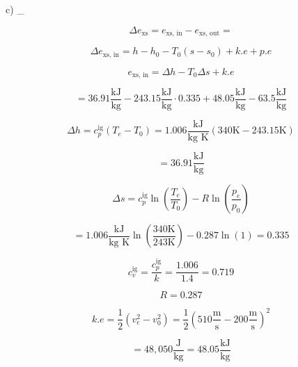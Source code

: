 c) \quad {}_{}

\[
\Delta e_{\text{xs}} = e_{\text{xs, in}} - e_{\text{xs, out}} = 
\]

\[
\Delta e_{\text{xs, in}} = h - h_0 - T_0 (s - s_0) + k.e + p.e
\]

\[
e_{\text{xs, in}} = \Delta h - T_0 \Delta s + k.e
\]

\[
= 36.91 \frac{\text{kJ}}{\text{kg}} - 243.15 \frac{\text{kJ}}{\text{kg}} \cdot 0.335 + 48.05 \frac{\text{kJ}}{\text{kg}} - 63.5 \frac{\text{kJ}}{\text{kg}}
\]

\[
\Delta h = c_p^{\text{ig}} (T_e - T_0) = 1.006 \frac{\text{kJ}}{\text{kg K}} (340 \text{K} - 243.15 \text{K})
\]

\[
= 36.91 \frac{\text{kJ}}{\text{kg}}
\]

\[
\Delta s = c_p^{\text{ig}} \ln \left( \frac{T_e}{T_0} \right) - R \ln \left( \frac{p_e}{p_0} \right)
\]

\[
= 1.006 \frac{\text{kJ}}{\text{kg K}} \ln \left( \frac{340 \text{K}}{243 \text{K}} \right) - 0.287 \ln (1) = 0.335
\]

\[
c_v^{\text{ig}} = \frac{c_p^{\text{ig}}}{k} = \frac{1.006}{1.4} = 0.719
\]

\[
R = 0.287
\]

\[
k.e = \frac{1}{2} (v_e^2 - v_0^2) = \frac{1}{2} (510 \frac{\text{m}}{\text{s}} - 200 \frac{\text{m}}{\text{s}})^2
\]

\[
= 48,050 \frac{\text{J}}{\text{kg}} = 48.05 \frac{\text{kJ}}{\text{kg}}
\]